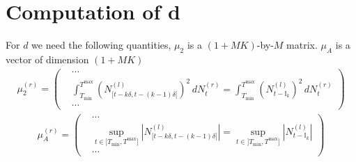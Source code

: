 \documentclass{article}
\newcommand{\be}{\begin{eqnarray*}}
\newcommand{\ee}{\end{eqnarray*}}
\newcommand{\dsp}{\displaystyle}
\def\Ik{\mathbb{I}_k}
\def\Tmin{T_{\min}}
\def\Tmax{T^{\max}}
\begin{document}
\section{Computation of d}
For $d$ we need the following quantities, $\mu_2$ is a $(1+MK)$-by-$M$ matrix.
$\mu_A$ is a vector of dimension $(1+MK)$
\be
\mu_2^{(r)} = \left(
\begin{array}{ll}
  &\cdots\\
&\dsp\int_{\Tmin}^{\Tmax}\left(N^{(l)}_{[t-k\delta,t-(k-1)\delta[}\right)^2\,dN^{(r)}_t = \dsp\int_{\Tmin}^{\Tmax}(N^{(l)}_{t-\Ik})^2\,dN^{(r)}_t \\
  &\cdots
\end{array}
\right)
\ee
\be
\mu_A^{(r)} = \left(
\begin{array}{ll}
  &\cdots\\
&\dsp\sup_{t\in]\Tmin,\Tmax]}|N^{(l)}_{[t-k\delta,t-(k-1)\delta[}|=\dsp\sup_{t\in]\Tmin,\Tmax]}|N^{(l)}_{t-\Ik}|\\
  &\cdots
\end{array}
\right)
\ee
\end{document}
